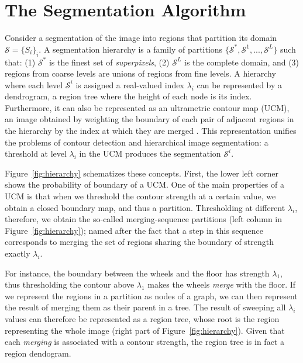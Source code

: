 \documentclass[10pt,journal,cspaper,compsoc]{IEEEtran}
\begin{document}
\section{The Segmentation Algorithm}
Consider a segmentation of the image into regions that partition its domain $\mathcal{S} = \{ S_i\}_i$. 
A segmentation hierarchy is a family of partitions $\{\mathcal{S}^*,\mathcal{S}^{1},...,\mathcal{S}^{L}\}$ such that: (1) $\mathcal{S}^{*}$ is the finest set of \emph{superpixels}, (2) $\mathcal{S}^{L}$ is the complete domain, and (3) regions from coarse levels are unions of regions from fine levels.
A hierarchy where each level $\mathcal{S}^{i}$ is assigned a real-valued index $\lambda_i$ can be represented by a dendrogram, a region tree where the height of each node is its index. 
Furthermore, it can also be represented as an ultrametric contour map (UCM), an image obtained by weighting the boundary of each pair of adjacent regions in the hierarchy by the index at which they are merged \cite{Najman1996,Arbelaez:POCV06}. 
This representation unifies the problems of contour detection and hierarchical image segmentation: a threshold at level $\lambda_i$ in the UCM produces the segmentation $\mathcal{S}^i$. 

Figure~\ref{fig:hierarchy} schematizes these concepts.
First, the lower left corner shows the probability of boundary of a UCM.
One of the main properties of a UCM is that when we threshold the contour strength at a certain value,
we obtain a closed boundary map, and thus a partition.
Thresholding at different $\lambda_i$, therefore, we obtain the so-called merging-sequence partitions
(left column in Figure~\ref{fig:hierarchy}); named after the fact that a step in this sequence
corresponds to merging the set of regions sharing the boundary of strength exactly $\lambda_i$.

For instance, the boundary between the wheels and the floor has strength $\lambda_1$,
thus thresholding the contour above $\lambda_1$ makes the wheels \textit{merge} with the floor.
If we represent the regions in a partition as nodes of a graph, we can then represent the result
of merging them as their parent in a tree.
The result of sweeping all $\lambda_i$ values can therefore be represented as a region tree, 
whose root is the region representing the whole image (right part of Figure~\ref{fig:hierarchy}).
Given that each \textit{merging} is associated with a contour strength,
the region tree is in fact a region dendogram.
\end{document}
